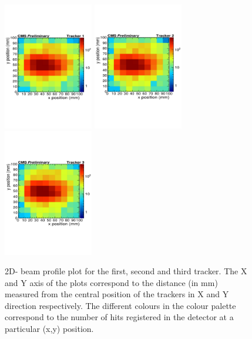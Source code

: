 \begin{figure}[!htbp]
\centering
\includegraphics[width=0.35\textwidth]{figures/GEM/Selection_027.pdf}%
\includegraphics[width=0.35\textwidth]{figures/GEM/Selection_028.pdf}%
\includegraphics[width=0.35\textwidth]{figures/GEM/Selection_029.pdf}
\caption{2D- beam profile plot for the first, second and third tracker. The X and Y axis of the plots correspond to the distance (in mm) measured from the central position of the trackers in X and Y direction respectively. The different colours in the colour palette correspond to the number of hits registered in the detector at a particular (x,y) position.}\label{fig:BeamProfile}
\end{figure}

